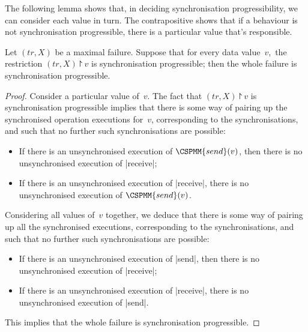 
The following lemma shows that, in deciding synchronisation progressibility,
we can consider each value in turn.  The contrapositive shows that if a
behaviour is not synchronisation progressible, there is a particular value
that's responsible.

\begin{lemma}
\label{lem:progressibility-specific-value}
Let $(tr,X)$ be a maximal failure.  Suppose that for every data value~$v$,\,
the restriction $(tr,X) \project v$ is synchronisation progressible;
then the whole failure is synchronisation progressible.
\end{lemma}


\begin{proof}
Consider a particular value of~$v$.  The fact that $(tr,X) \project v$ is
synchronisation progressible implies that there is some way of pairing up the
synchronised operation executions for~$v$, corresponding to the
synchronisations, and such that no further such synchronisations are possible:
%
\begin{itemize}
\item If there is an unsynchronised execution of $\CSPMM{send}(v)$, then
  there is no unsynchronised execution of |receive|;

\item If there is an unsynchronised execution of |receive|, there is no
  unsynchronised execution of $\CSPMM{send}(v)$.
\end{itemize}

Considering all values of~$v$ together, we deduce that there is some way of
pairing up all the synchronised executions, corresponding to the
synchronisations, and such that no further such synchronisations are possible:
%
\begin{itemize}
\item If there is an unsynchronised execution of |send|, then
  there is no unsynchronised execution of |receive|;

\item If there is an unsynchronised execution of |receive|, there is no
  unsynchronised execution of |send|.
\end{itemize}
%
This implies that the whole failure is synchronisation progressible. 
\end{proof}


